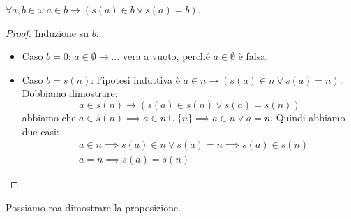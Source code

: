 \documentclass[11pt]{scrartcl}
\begin{document}
\begin{lemma}
	$\forall a,b \in \omega \; a \in b \rightarrow (s(a) \in b \lor s(a) = b)$.
\end{lemma}

\begin{proof}
	Induzione su $b$.
	\begin{itemize}
		\item Caso $b = 0$: $a \in \emptyset \rightarrow \ldots$ vera a vuoto, perché $a \in \emptyset$ è falsa.
		\item Caso $b = s(n)$: l'ipotesi induttiva è $a \in n \rightarrow (s(a) \in n \lor s(a) = n)$. Dobbiamo dimostrare:
		\[ a \in s(n) \rightarrow (s(a) \in s(n) \lor s(a) = s(n))
			\]
		abbiamo che $a \in s(n) \implies a \in n \cup \{n\} \implies a \in n \lor a = n$. Quindi abbiamo due casi:
		\[ \begin{split}
			& a \in n \implies s(a) \in n \lor s(a) = n \implies s(a) \in s(n) \\
			& a = n \implies s(a) = s(n)
		\end{split}
			\]
	\end{itemize}
\end{proof}

Possiamo roa dimostrare la proposizione.
\end{document}
